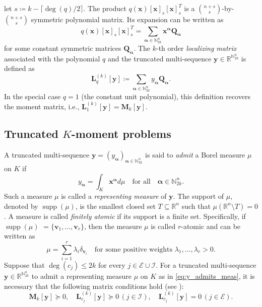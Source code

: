 \documentclass[pdflatex,sn-mathphys-num]{sn-jnl}%
\newcommand{\vect}[1]{\boldsymbol{#1}}
\newcommand{\mat}[1]{\boldsymbol{#1}}
\newcommand{\supp}[1]{\operatorname{supp}(#1)}
\theoremstyle{thmstyleone}%
\theoremstyle{thmstyletwo}%
\theoremstyle{thmstylethree}%
\begin{document}
let $s \coloneqq k - \lceil \deg(q)/2 \rceil$.
The product $q(\vect{x}) [\vect{x}]_s [\vect{x}]_s^T$ is a $\binom{n+s}{s}$-by-$\binom{n+s}{s}$
symmetric polynomial matrix. 
Its expansion can be written as
\begin{equation*}
	q(\vect{x}) [\vect{x}]_s [\vect{x}]_s^T
	= \sum_{\vect{\alpha} \in \mathbb{N}_{2k}^n}
	\vect{x}^{\vect{\alpha}}\mat{Q}_{\vect{\alpha}}
\end{equation*}
for some constant symmetric matrices $\mat{Q}_{\vect{\alpha}}$. 
The $k$-th order \textit{localizing matrix} associated with 
the polynomial $q$ and the truncated multi-sequence $\vect{y} \in \mathbb{R}^{\mathbb{N}_{2k}^n}$ is defined as
\begin{equation*}
	\mat{L}^{(k)}_q [\vect{y}] \coloneqq
	\sum_{\vect{\alpha} \in \mathbb{N}_{2k}^n}
	y_{\vect{\alpha}}\mat{Q}_{\vect{\alpha}}.
\end{equation*}
In the special case $q=1$ (the constant unit polynomial),
this definition recovers the moment matrix, i.e., $\mat{L}^{(k)}_1 [\vect{y}] = \mat{M}_k[\vect{y}]$.



\subsection{Truncated \texorpdfstring{$K$}{K}-moment problems}

A truncated multi-sequence
$\vect{y} = (y_{\vect{\alpha}})_{\vect{\alpha} \in \mathbb{N}^n_{2k}}$
is said to
\textit{admit} a Borel measure $\mu$ on $K$ if
\begin{equation} \label{eq:y_admits_meas}
	y_{\vect{\alpha}} = \int_K \vect{x}^{\vect{\alpha}} d \mu
	\quad \text{for all} \quad
	\vect{\alpha} \in \mathbb{N}^n_{2k}.
\end{equation}
Such a measure $\mu$ is called a \textit{representing measure} of $\vect{y}$.
The support of $\mu$, denoted by $\supp{\mu}$,
is the smallest closed set $T \subseteq \mathbb{R}^n$ 
such that $\mu(\mathbb{R}^n \setminus T) = 0$.
A measure is called \textit{finitely atomic} if its support is a finite set.
Specifically, if $\supp{\mu}$ $= \{\vect{v}_1, \ldots, \vect{v}_r\}$,
then the measure $\mu$ is called $r$-atomic and can be written as
\[
\mu = \sum_{i=1}^r \lambda_i \delta_{\vect{v}_i} \quad 
\text{for some positive weights } \lambda_1, \dots, \lambda_r > 0.
\]
Suppose that $\deg(c_j)\leq 2k$ for every
$j\in\mathcal{E}\cup\mathcal{I}$.
For a truncated multi-sequence $\vect{y} \in \mathbb{R}^{\mathbb{N}_{2k}^n}$ to admit a representing measure
$\mu$ on $K$ as in \eqref{eq:y_admits_meas}, 
it is necessary that the following matrix conditions hold (see \cite{MPO}):
\begin{equation} \label{eq:loc_mom}
	\mat{M}_k[\vect{y}] \succeq 0, \quad \mat{L}_{c_j}^{(k)}[\vect{y}] \succeq 0 \,(j \in \mathcal{I}), \quad
	\mat{L}_{c_j}^{(k)}[\vect{y}] = 0 \, (j \in \mathcal{E}).
\end{equation}
\end{document}
